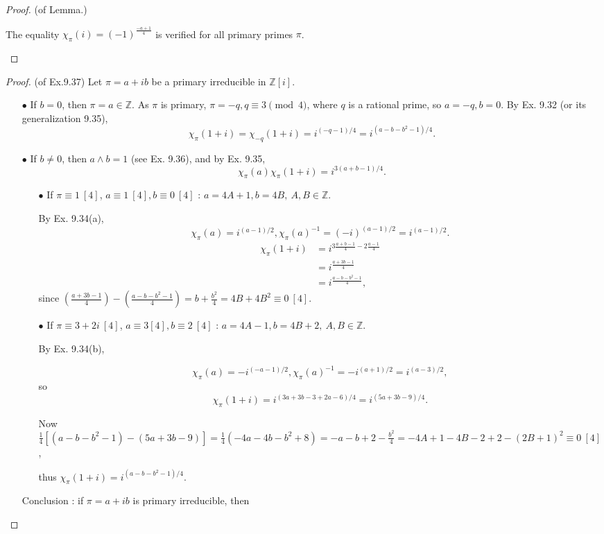 \documentclass[11pt,a4paper]{article}
\newcommand{\Z}{\mathbb{Z}}
\begin{document}
\begin{proof}{(of Lemma.)}
\begin{enumerate}
The equality $\chi_\pi(i) = (-1)^\frac{-a+1}{4}$ is verified for all primary primes $\pi$.
\end{enumerate}

\end{proof}

\begin{proof}{(of Ex.9.37)}
Let $\pi = a + ib$ be a primary irreducible in $\Z[i]$.
\begin{enumerate}
\item[$\bullet$] If $b = 0$, then $\pi = a \in \Z$.
As $\pi$ is primary, $\pi = -q, q\equiv 3 \pmod 4$, where $q$ is a rational prime, so $a=-q, b = 0$.
By Ex. 9.32 (or its generalization 9.35),
 $$\chi_\pi(1+i) = \chi_{-q}(1+i) = i^{(-q-1)/4} = i^{(a-b-b^2-1)/4}.$$
 \item[$\bullet$] If $b \ne  0$, then $a\wedge b = 1$ (see Ex. 9.36), and by Ex. 9.35, 
 $$\chi_\pi(a) \chi_\pi(1+i) = i^{3(a+b-1)/4}.$$
 	\begin{enumerate}
	\item[$\bullet$]  If $\pi \equiv 1\ [4]$, $a \equiv 1\ [4], b \equiv 0 \ [4]$ : $a=4A+1,b=4B,\ A,B\in \mathbb{Z}$.
	
By Ex. 9.34(a),
$$\chi_\pi(a) = i^{(a-1)/2}, \chi_\pi(a)^{-1} = (-i)^{(a-1)/2} = i^{(a-1)/2}.$$
\begin{align*}
\chi_{\pi}(1+i) &= i^{3 \frac{a+b-1}{4} - 2 \frac{a-1}{4}}\\
&=i^{\frac{a+3b-1}{4}}\\
&=i^{\frac{a-b-b^2-1}{4}},
\end{align*}
since $\left( \frac{a+3b-1}{4} \right)- \left( \frac{a-b-b^2-1}{4}\right) = b + \frac{b^2}{4} = 4B+4B^2 \equiv 0 \ [4]$.

	\item[$\bullet$] If $\pi \equiv 3+2i\  [4]$, $a \equiv 3[4], b \equiv 2 \ [4]$ : $a=4A-1,b=4B+2,\ A,B\in\mathbb{Z}$.
	
By Ex. 9.34(b),

$$\chi_\pi(a) =- i^{(-a-1)/2}, \chi_\pi(a)^{-1} = -i^{(a+1)/2} = i^{(a-3)/2},$$
so
$$\chi_\pi(1+i) = i^{(3a+3b-3+2a-6)/4} = i^{(5a+3b-9)/4}.$$

Now $\frac{1}{4}[(a-b-b^2-1) - (5a+3b-9)] = \frac{1}{4}(-4a-4b-b^2+8) = -a-b+2 -\frac{b^2}{4} = -4A+1-4B-2+2 -(2B+1)^2 \equiv 0 \ [4]$,

thus $\chi_\pi(1+i) = i^{(a-b-b^2-1)/4}$.



	\end{enumerate}
	Conclusion : if $\pi =a+ib$ is primary irreducible, then


\end{enumerate}
\end{proof}
\end{document}

